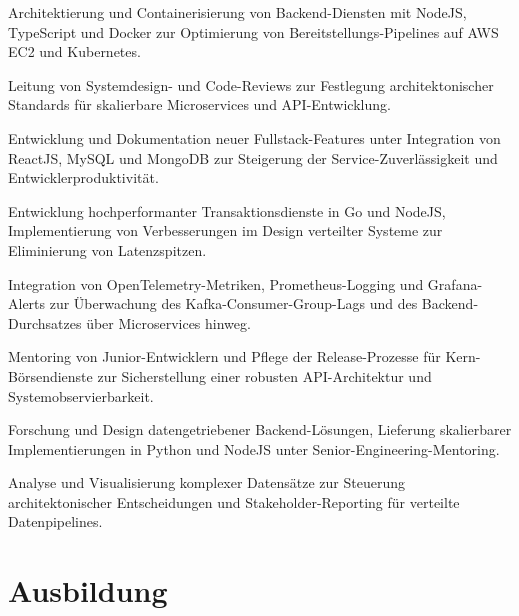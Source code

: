 \documentclass[10pt,a4paper]{resume}
\begin{document}
\bullets
  \item Architektierung und Containerisierung von Backend-Diensten mit NodeJS, TypeScript und Docker zur Optimierung von Bereitstellungs-Pipelines auf AWS EC2 und Kubernetes.
  \item Leitung von Systemdesign- und Code-Reviews zur Festlegung architektonischer Standards für skalierbare Microservices und API-Entwicklung.
  \item Entwicklung und Dokumentation neuer Fullstack-Features unter Integration von ReactJS, MySQL und MongoDB zur Steigerung der Service-Zuverlässigkeit und Entwicklerproduktivität.
\bulletsend
\vspace{1.5pt}
\bullets
  \item Entwicklung hochperformanter Transaktionsdienste in Go und NodeJS, Implementierung von Verbesserungen im Design verteilter Systeme zur Eliminierung von Latenzspitzen.
  \item Integration von OpenTelemetry-Metriken, Prometheus-Logging und Grafana-Alerts zur Überwachung des Kafka-Consumer-Group-Lags und des Backend-Durchsatzes über Microservices hinweg.
  \item Mentoring von Junior-Entwicklern und Pflege der Release-Prozesse für Kern-Börsendienste zur Sicherstellung einer robusten API-Architektur und Systemobservierbarkeit.
\bulletsend
\vspace{1.5pt}
\bullets
  \item Forschung und Design datengetriebener Backend-Lösungen, Lieferung skalierbarer Implementierungen in Python und NodeJS unter Senior-Engineering-Mentoring.
  \item Analyse und Visualisierung komplexer Datensätze zur Steuerung architektonischer Entscheidungen und Stakeholder-Reporting für verteilte Datenpipelines.
\bulletsend
\vspace{1.5pt}

\section{Ausbildung}

\vspace{2pt}
\end{document}
